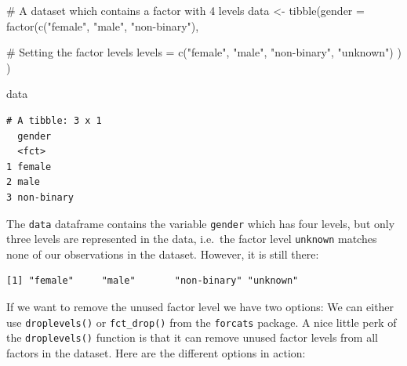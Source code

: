 \documentclass[
  letterpaper,
  DIV=11,
  numbers=noendperiod]{scrreprt}
\newenvironment{Shaded}{\begin{snugshade}}{\end{snugshade}}
\newcommand{\AttributeTok}[1]{\textcolor[rgb]{0.40,0.45,0.13}{#1}}
\newcommand{\CommentTok}[1]{\textcolor[rgb]{0.37,0.37,0.37}{#1}}
\newcommand{\FunctionTok}[1]{\textcolor[rgb]{0.28,0.35,0.67}{#1}}
\newcommand{\NormalTok}[1]{\textcolor[rgb]{0.00,0.23,0.31}{#1}}
\newcommand{\OtherTok}[1]{\textcolor[rgb]{0.00,0.23,0.31}{#1}}
\newcommand{\SpecialCharTok}[1]{\textcolor[rgb]{0.37,0.37,0.37}{#1}}
\newcommand{\StringTok}[1]{\textcolor[rgb]{0.13,0.47,0.30}{#1}}
\begin{document}
\begin{Shaded}
\begin{Highlighting}[]
\CommentTok{\# A dataset which contains a factor with 4 levels}
\NormalTok{data }\OtherTok{\textless{}{-}} \FunctionTok{tibble}\NormalTok{(}\AttributeTok{gender =} \FunctionTok{factor}\NormalTok{(}\FunctionTok{c}\NormalTok{(}\StringTok{"female"}\NormalTok{,}
                                 \StringTok{"male"}\NormalTok{,}
                                 \StringTok{"non{-}binary"}\NormalTok{),}
                               
                               \CommentTok{\# Setting the factor levels}
                               \AttributeTok{levels =} \FunctionTok{c}\NormalTok{(}\StringTok{"female"}\NormalTok{,}
                                          \StringTok{"male"}\NormalTok{,}
                                          \StringTok{"non{-}binary"}\NormalTok{,}
                                          \StringTok{"unknown"}\NormalTok{)}
\NormalTok{                               )}
\NormalTok{               )}

\NormalTok{data}
\end{Highlighting}
\end{Shaded}

\begin{verbatim}
# A tibble: 3 x 1
  gender    
  <fct>     
1 female    
2 male      
3 non-binary
\end{verbatim}

The \texttt{data} dataframe contains the variable \texttt{gender} which
has four levels, but only three levels are represented in the data,
i.e.~the factor level \texttt{unknown} matches none of our observations
in the dataset. However, it is still there:

\begin{Shaded}
\end{Shaded}

\begin{verbatim}
[1] "female"     "male"       "non-binary" "unknown"   
\end{verbatim}

If we want to remove the unused factor level we have two options: We can
either use \texttt{droplevels()} or \texttt{fct\_drop()} from the
\texttt{forcats} package. A nice little perk of the
\texttt{droplevels()} function is that it can remove unused factor
levels from all factors in the dataset. Here are the different options
in action:
\end{document}
